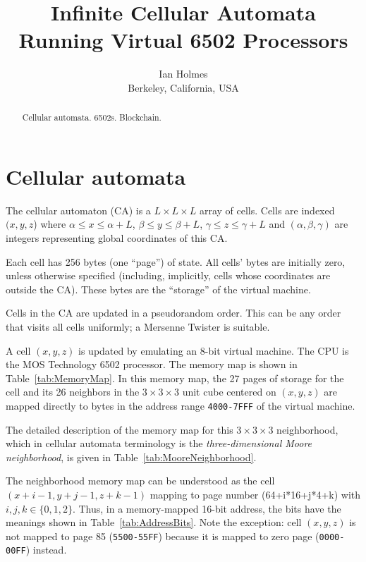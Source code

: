 \documentclass{article}
\newcommand\hex[1]{{\tt #1}}
\newcommand\hexrange[2]{\hex{#1}{\tt -}\hex{#2}}
\begin{document}
\title{Infinite Cellular Automata Running Virtual 6502 Processors}
\author{Ian Holmes \\ Berkeley, California, USA}

\maketitle


\begin{abstract}
  Cellular automata.
  6502s.
  Blockchain.
\end{abstract}

\section{Cellular automata}

The cellular automaton (CA) is a $L \times L \times L$ array of cells.
Cells are indexed $(x,y,z$) where
$\alpha \leq x \leq \alpha+L$,
$\beta \leq y \leq \beta+L$,
$\gamma \leq z \leq \gamma+L$
and $(\alpha,\beta,\gamma)$ are integers representing global coordinates of this CA.

Each cell has 256 bytes (one ``page'') of state.
All cells' bytes are initially zero, unless otherwise specified
(including, implicitly, cells whose coordinates are outside the CA).
These bytes are the ``storage'' of the virtual machine.

Cells in the CA are updated in a pseudorandom order.
This can be any order that visits all cells uniformly;
a Mersenne Twister is suitable.

A cell $(x,y,z)$ is updated by emulating an 8-bit virtual machine.
The CPU is the MOS Technology 6502 processor.
The memory map is shown in Table~\ref{tab:MemoryMap}.
In this memory map, the 27 pages of storage
for the cell and its 26 neighbors
in the $3 \times 3 \times 3$ unit cube centered on $(x,y,z)$
are mapped directly to bytes in the address range \hexrange{4000}{7FFF} of the virtual machine.

The detailed description of the memory map for this $3 \times 3 \times 3$ neighborhood,
which in cellular automata terminology is
the {\em three-dimensional Moore neighborhood},
is given in Table~\ref{tab:MooreNeighborhood}.

The neighborhood memory map can be understood as the cell $(x+i-1,y+j-1,z+k-1)$
mapping to page number (64+i*16+j*4+k) with $i,j,k \in \{0,1,2\}$.
Thus, in a memory-mapped 16-bit address, the bits have the meanings shown in Table~\ref{tab:AddressBits}.
Note the exception: cell $(x,y,z)$ is not mapped to page 85 (\hexrange{5500}{55FF})
because it is mapped to zero page (\hexrange{0000}{00FF}) instead.
\end{document}
